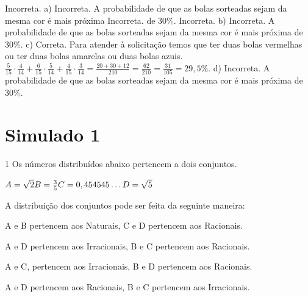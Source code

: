 \begin{escolha}
\begin{escolha}
\begin{escolha}
\begin{escolha}
{\begin{boxmedio}
\begin{boxpeq}
\begin{q°}
\begin{boxmedio}
\begin{boxpeq}
\begin{boxpeq}
\begin{boxmedio}
\begin{boxmedio}
\begin{boxmedio}
\begin{largebox}
\begin{boxmedio}
{\begin{enumerate}
\begin{boxpeq}
{\begin{boxpeq}
\begin{boxpeq}
\begin{boxmedio}
\begin{boxpeq}
\begin{boxpeq}
\begin{boxpeq}
{ Incorreta. a) Incorreta. A probabilidade de que as bolas sorteadas sejam da mesma cor é mais próxima Incorreta.  de 30\%.
 Incorreta. b) Incorreta. A probabilidade de que as bolas sorteadas sejam da mesma cor é mais próxima de 30\%.
c) Correta. Para atender à solicitação temos que ter duas bolas vermelhas ou ter
duas bolas amarelas ou duas bolas azuis. $\frac{5}{15} \cdot \frac{4}{14} + \frac{6}{15} \cdot \frac{5}{14} + \frac{4}{15} \cdot \frac{3}{14} = \frac{20 + 30 + 12}{210} = \frac{62}{210} = \frac{31}{105} = 29,5\%$.
d) Incorreta. A probabilidade de que as bolas sorteadas sejam da mesma cor é mais próxima de 30\%.}

\chapter{Simulado 1}

\num{1} Os números distribuídos abaixo pertencem a dois conjuntos.

$A = \sqrt{2} \\ 
B = \frac{3}{5} \\ 
C = 0,454545\ldots{} \\
D = \sqrt{5}$

A distribuição dos conjuntos pode ser feita da seguinte maneira:

\begin{escolha}

  \item A e B pertencem aos Naturais, C e D pertencem aos Racionais.

  \item A e D pertencem aos Irracionais, B e C pertencem aos Racionais.
  
  \item A e C, pertencem aos Irracionais, B e D pertencem aos Racionais.
  
  \item A e D pertencem aos Racionais, B e C pertencem aos Irracionais.

\end{escolha}

\end{boxpeq}
\end{boxpeq}
\end{boxpeq}
\end{boxmedio}
\end{boxpeq}
\end{boxpeq}}
\end{boxpeq}
\end{enumerate}}
\end{boxmedio}
\end{largebox}
\end{boxmedio}
\end{boxmedio}
\end{boxmedio}
\end{boxpeq}
\end{boxpeq}
\end{boxmedio}
\end{q°}
\end{boxpeq}
\end{boxmedio}}
\end{escolha}
\end{escolha}
\end{escolha}
\end{escolha}
